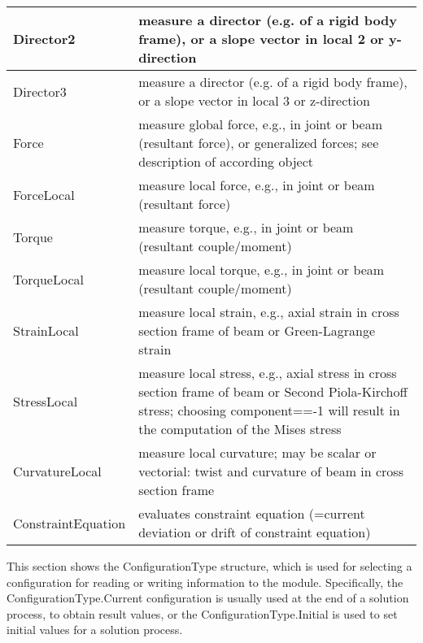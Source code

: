 \begin{center}
\begin{longtable}{| p{8cm} | p{8cm} |}
  Director2 & measure a director (e.g. of a rigid body frame), or a slope vector in local 2 or y-direction\\ \hline  
  Director3 & measure a director (e.g. of a rigid body frame), or a slope vector in local 3 or z-direction\\ \hline  
  Force & measure global force, e.g., in joint or beam (resultant force), or generalized forces; see description of according object\\ \hline  
  ForceLocal & measure local force, e.g., in joint or beam (resultant force)\\ \hline  
  Torque & measure torque, e.g., in joint or beam (resultant couple/moment)\\ \hline  
  TorqueLocal & measure local torque, e.g., in joint or beam (resultant couple/moment)\\ \hline  
  StrainLocal & measure local strain, e.g., axial strain in cross section frame of beam or Green-Lagrange strain\\ \hline  
  StressLocal & measure local stress, e.g., axial stress in cross section frame of beam or Second Piola-Kirchoff stress; choosing component==-1 will result in the computation of the Mises stress\\ \hline  
  CurvatureLocal & measure local curvature; may be scalar or vectorial: twist and curvature of beam in cross section frame\\ \hline  
  ConstraintEquation & evaluates constraint equation (=current deviation or drift of constraint equation)\\ \hline  
\end{longtable}
\end{center}

\label{sec:ConfigurationType}
This section shows the ConfigurationType structure, which is used for selecting a configuration for reading or writing information to the module. Specifically, the ConfigurationType.Current configuration is usually used at the end of a solution process, to obtain result values, or the ConfigurationType.Initial is used to set initial values for a solution process.




